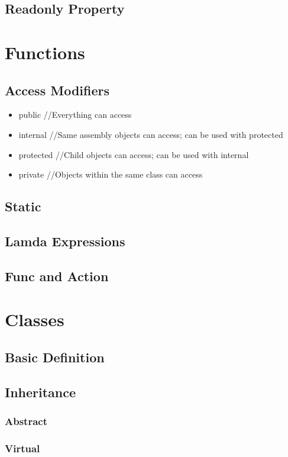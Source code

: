 \documentclass {amsart}
\begin{document}
	\subsection{Readonly Property}

\section{Functions}
	\subsection{Access Modifiers}
		\begin{itemize}
			\item public 		//Everything can access
			\item internal 	//Same assembly objects can access; can be used with protected
			\item protected	//Child objects can access; can be used with internal
			\item private		//Objects within the same class can access
		\end{itemize}

	\subsection{Static}
	\subsection{Lamda Expressions}
	\subsection{Func and Action}


\section{Classes}
	\subsection{Basic Definition}
	\subsection{Inheritance}
		\subsubsection{Abstract}
		\subsubsection{Virtual}
\end{document}
